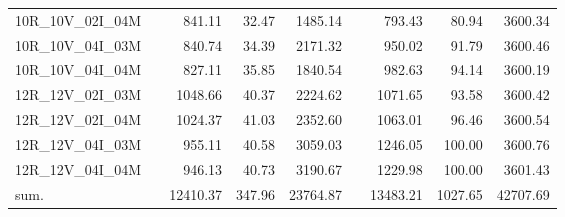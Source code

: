 \begin{tabular}{llrrrlrrr}
10R\_10V\_02I\_04M & \hspace{0.1cm} & 841.11 & 32.47 & 1485.14 & \hspace{0.2cm} & 793.43 & 80.94 & 3600.34\\
10R\_10V\_04I\_03M & \hspace{0.1cm} & 840.74 & 34.39 & 2171.32 & \hspace{0.2cm} & 950.02 & 91.79 & 3600.46\\
10R\_10V\_04I\_04M & \hspace{0.1cm} & 827.11 & 35.85 & 1840.54 & \hspace{0.2cm} & 982.63 & 94.14 & 3600.19\\
\addlinespace
12R\_12V\_02I\_03M & \hspace{0.1cm} & 1048.66 & 40.37 & 2224.62 & \hspace{0.2cm} & 1071.65 & 93.58 & 3600.42\\
12R\_12V\_02I\_04M & \hspace{0.1cm} & 1024.37 & 41.03 & 2352.60 & \hspace{0.2cm} & 1063.01 & 96.46 & 3600.54\\
12R\_12V\_04I\_03M & \hspace{0.1cm} & 955.11 & 40.58 & 3059.03 & \hspace{0.2cm} & 1246.05 & 100.00 & 3600.76\\
12R\_12V\_04I\_04M & \hspace{0.1cm} & 946.13 & 40.73 & 3190.67 & \hspace{0.2cm} & 1229.98 & 100.00 & 3601.43\\
\addlinespace
sum. & \hspace{0.1cm} & 12410.37 & 347.96 & 23764.87 & \hspace{0.2cm} & 13483.21 & 1027.65 & 42707.69\\
\bottomrule
\end{tabular}
